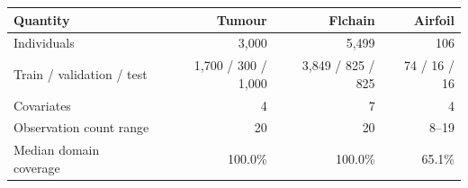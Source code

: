 \begin{tabular}{lrrr}
\toprule
Quantity & Tumour & Flchain & Airfoil \\
\midrule
Individuals & 3,000 & 5,499 & 106 \\
Train / validation / test & 1,700 / 300 / 1,000 & 3,849 / 825 / 825 & 74 / 16 / 16 \\
Covariates & 4 & 7 & 4 \\
Observation count range & 20 & 20 & 8--19 \\
Median domain coverage & 100.0\% & 100.0\% & 65.1\% \\
\bottomrule
\end{tabular}
